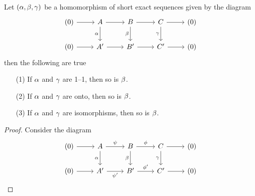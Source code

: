 \begin{lemma}\label{4.5.5}
    Let $(\alpha,\beta,\gamma)$ be a homomorphism of short exact sequences given by the
    diagram
    \begin{equation*}
        \begin{tikzcd}
            {(0)} & A & B & C & {(0)} \\
            {(0)} & {A'} & {B'} & {C'} & {(0)}
            \arrow[from=1-1, to=1-2]
            \arrow[from=1-2, to=1-3]
            \arrow[from=1-3, to=1-4]
            \arrow[from=1-4, to=1-5]
            \arrow[from=2-1, to=2-2]
            \arrow[from=2-2, to=2-3]
            \arrow[from=2-3, to=2-4]
            \arrow[from=2-4, to=2-5]
            \arrow["\gamma"', from=1-4, to=2-4]
            \arrow["\beta"', from=1-3, to=2-3]
            \arrow["\alpha"', from=1-2, to=2-2]
        \end{tikzcd}
    \end{equation*}
    then the following are true
    \begin{enumerate}
        \item[(1)] If $\alpha$ and  $\gamma$ are 1--1, then so is  $\beta$.

        \item[(2)] If $\alpha$ and  $\gamma$ are onto, then so is  $\beta$.

        \item[(3)] If $\alpha$ and  $\gamma$ are isomorphisms, then so is  $\beta$.
    \end{enumerate}
\end{lemma}
\begin{proof}
    Consider the diagram
    \begin{equation*}
        \begin{tikzcd}
            {(0)} & A & B & C & {(0)} \\
            {(0)} & {A'} & {B'} & {C'} & {(0)}
            \arrow[from=1-1, to=1-2]
            \arrow["\psi", from=1-2, to=1-3]
            \arrow["\phi", from=1-3, to=1-4]
            \arrow[from=1-4, to=1-5]
            \arrow[from=2-1, to=2-2]
            \arrow["{\psi'}"', from=2-2, to=2-3]
            \arrow["{\phi'}", from=2-3, to=2-4]
            \arrow[from=2-4, to=2-5]
            \arrow["\gamma"', from=1-4, to=2-4]
            \arrow["\beta"', from=1-3, to=2-3]
            \arrow["\alpha"', from=1-2, to=2-2]
        \end{tikzcd}
    \end{equation*}
\end{proof}
